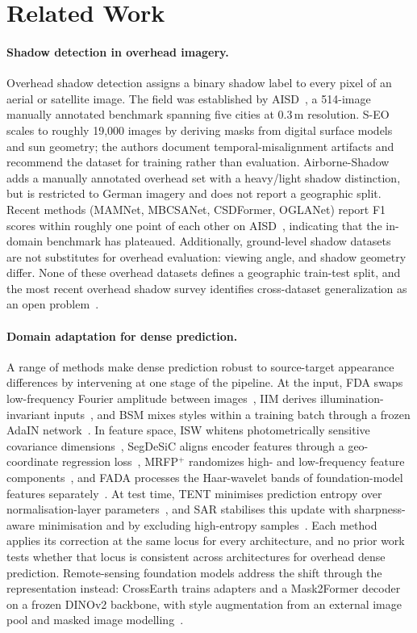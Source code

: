 \section{Related Work}
\label{sec:related}

\paragraph{Shadow detection in overhead imagery.}
Overhead shadow detection assigns a binary shadow label to every pixel of an aerial or satellite image. The field was established by AISD~\cite{aisd}, a 514-image manually annotated benchmark spanning five cities at 0.3\,m resolution. S-EO~\cite{seo} scales to roughly 19{,}000 images by deriving masks from digital surface models and sun geometry; the authors document temporal-misalignment artifacts and recommend the dataset for training rather than evaluation. Airborne-Shadow~\cite{azimi2023airborne} adds a manually annotated overhead set with a heavy/light shadow distinction, but is restricted to German imagery and does not report a geographic split. Recent methods (MAMNet, MBCSANet, CSDFormer, OGLANet) report F1 scores within roughly one point of each other on AISD~\cite{mamnet, mbcsanet, csdformer, oglanet}, indicating that the in-domain benchmark has plateaued. Additionally, ground-level shadow datasets~\cite{istd, sbu, cuhkshadow} are not substitutes for overhead evaluation: viewing angle, and shadow geometry differ. None of these overhead datasets defines a geographic train-test split, and the most recent overhead shadow survey identifies cross-dataset generalization as an open problem~\cite{hu2026unveiling}.

\paragraph{Domain adaptation for dense prediction.}
A range of methods make dense prediction robust to source-target appearance differences by intervening at one stage of the pipeline. At the input, FDA swaps low-frequency Fourier amplitude between images~\cite{fda}, IIM derives illumination-invariant inputs~\cite{yola}, and BSM mixes styles within a training batch through a frozen AdaIN network~\cite{luo2023bsm}. In feature space, ISW whitens photometrically sensitive covariance dimensions~\cite{isw}, SegDeSiC aligns encoder features through a geo-coordinate regression loss~\cite{segdesicnet}, MRFP$^+$ randomizes high- and low-frequency feature components~\cite{mrfp}, and FADA processes the Haar-wavelet bands of foundation-model features separately~\cite{fada}. At test time, TENT minimises prediction entropy over normalisation-layer parameters~\cite{wang2021tent}, and SAR stabilises this update with sharpness-aware minimisation and by excluding high-entropy samples~\cite{niu2023sar}. Each method applies its correction at the same locus for every architecture, and no prior work tests whether that locus is consistent across architectures for overhead dense prediction. Remote-sensing foundation models address the shift through the representation instead: CrossEarth trains adapters and a Mask2Former decoder on a frozen DINOv2 backbone, with style augmentation from an external image pool and masked image modelling~\cite{gong2025crossearth}.

